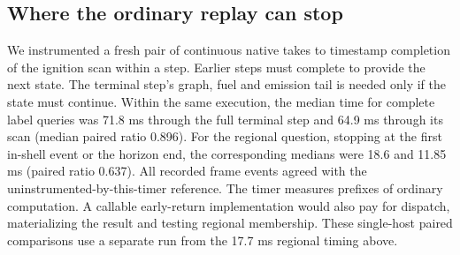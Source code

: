 \subsection{Where the ordinary replay can stop}
We instrumented a fresh pair of continuous native takes to timestamp completion of the ignition scan within a step. Earlier steps must complete to provide the next state. The terminal step's graph, fuel and emission tail is needed only if the state must continue. Within the same execution, the median time for complete label queries was 71.8 ms through the full terminal step and 64.9 ms through its scan (median paired ratio 0.896). For the regional question, stopping at the first in-shell event or the horizon end, the corresponding medians were 18.6 and 11.85 ms (paired ratio 0.637). All recorded frame events agreed with the uninstrumented-by-this-timer reference. The timer measures prefixes of ordinary computation. A callable early-return implementation would also pay for dispatch, materializing the result and testing regional membership. These single-host paired comparisons use a separate run from the 17.7 ms regional timing above.
